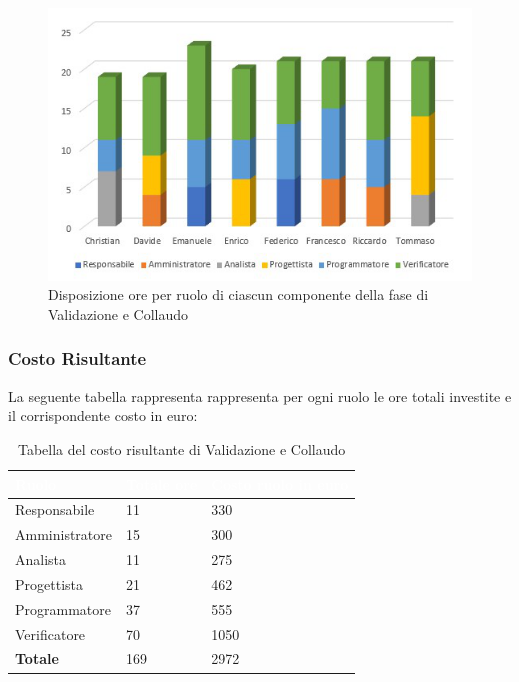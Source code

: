 \begin{figure}[h!]
	\centering
	
	\includegraphics[scale=2.8]{Sezioni/Istogrammi/IstogrammaValidazione.png}
	\caption{Disposizione ore per ruolo di ciascun componente della fase di Validazione e Collaudo}
\end{figure}

\subsubsection{Costo Risultante}
La seguente tabella rappresenta rappresenta per ogni ruolo le ore totali investite e il corrispondente costo in euro:
{
	\renewcommand{\arraystretch}{2}

	
	\begin{longtable}[h!]	{ C{3cm} C{2cm} C{4cm}}
	\caption{Tabella del costo risultante di Validazione e Collaudo}\\
		\textcolor{white}{\textbf{Ruolo}} & 
		\textcolor{white}{\textbf{Totale ore}} & 
		\textcolor{white}{\textbf{Costo ruolo in euro}}\\	
		\endhead
        
        Responsabile & 11 & 330\\
        Amministratore & 15 & 300 \\
        Analista & 11 & 275\\
        Progettista & 21 & 462\\
        Programmatore & 37 & 555\\
        Verificatore & 70 & 1050\\
        \textbf{Totale} & 169 & 2972\
	
	\end{longtable}

	
}

